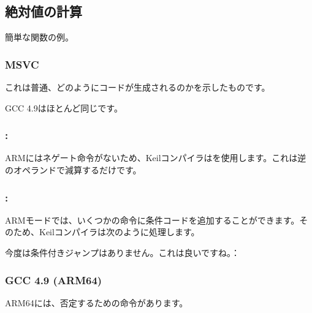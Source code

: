 \subsection{絶対値の計算}
\label{sec:abs}

簡単な関数の例。



\subsubsection{\Optimizing MSVC}

これは普通、どのようにコードが生成されるのかを示したものです。



GCC 4.9はほとんど同じです。

\subsubsection{\OptimizingKeilVI: \ThumbMode}




ARMにはネゲート命令がないため、Keilコンパイラはを使用します。これは逆のオペランドで減算するだけです。

\subsubsection{\OptimizingKeilVI: \ARMMode}

ARMモードでは、いくつかの命令に条件コードを追加することができます。そのため、Keilコンパイラは次のように処理します。



今度は条件付きジャンプはありません。これは良いですね。：

\subsubsection{\NonOptimizing GCC 4.9 (ARM64)}


ARM64には、否定するための命令があります。

